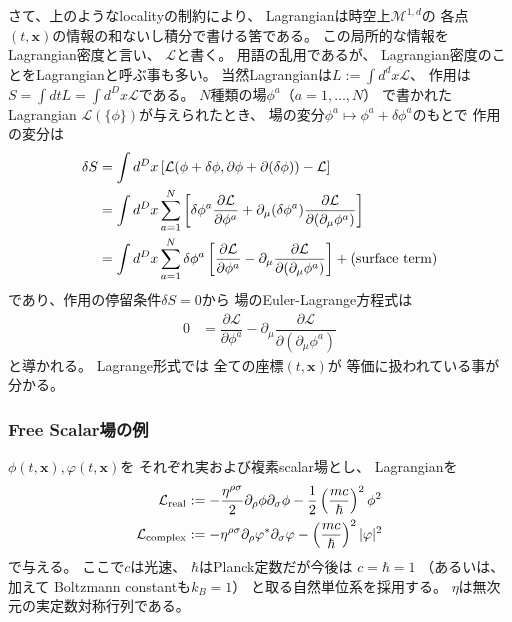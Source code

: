 さて、上のようなlocalityの制約により、
Lagrangianは時空上$\mathcal{M}^{1,d}$の
各点$(t, \bm{x})$の情報の和ないし積分で書ける筈である。
この局所的な情報をLagrangian密度と言い、
$\mathcal{L}$と書く。
用語の乱用であるが、
Lagrangian密度のことをLagrangianと呼ぶ事も多い。
当然Lagrangianは$L := \int d^d x \mathcal{L}$、
作用は$S= \int dt L = \int d^D x \mathcal{L}$である。
$N$種類の場$\phi^a$（$a = 1, \dots, N$）
で書かれたLagrangian
$\mathcal{L}(\{ \phi \})$が与えられたとき、
場の変分$\phi^a \mapsto
\phi^a + \delta \phi^a$のもとで
作用の変分は
\begin{align}
    \delta S
    &=
    \int d^D x
    \left[
        \mathcal{L}(\phi + \delta \phi ,
        \partial \phi + \partial (\delta \phi))
        - \mathcal{L}
    \right]
\notag\\&=
    \int d^D x
        \sum_{a = 1}^N
    \left[
        \delta \phi^a
        \dfrac{\partial \mathcal{L}}
            {\partial \phi^a}
        +
        \partial_\mu (\delta \phi^a)
        \dfrac{\partial \mathcal{L}}
            {\partial (\partial_\mu \phi^a)}
    \right]
\notag\\&=
    \int d^D x
        \sum_{a = 1}^N
    \delta \phi^a
    \left[
        \dfrac{\partial \mathcal{L}}
            {\partial \phi^a}
        -
        \partial_\mu
        \dfrac{\partial \mathcal{L}}
            {\partial (\partial_\mu \phi^a)}
    \right]
    + \text{(surface term)}
\end{align}
であり、作用の停留条件$\delta S = 0$から
場のEuler-Lagrange方程式は
\begin{align}
    0 &=
    \dfrac{\partial \mathcal{L}}
        {\partial \phi^a}
    -
    \partial_\mu
    \dfrac{\partial \mathcal{L}}
        {\partial (\partial_\mu \phi^a)}
\label{field EL eq}
\end{align}
と導かれる。
Lagrange形式では
全ての座標$(t, \bm{x})$が
等価に扱われている事が分かる。

\subsubsection{Free Scalar場の例}

$\phi(t, \bm{x}), \varphi(t, \bm{x})$を
それぞれ実および複素scalar場とし、
Lagrangianを
\begin{align}
    \mathcal{L}_{\rm real}
    &:=
    -
    \dfrac{ \eta^{\rho\sigma} }{2}
        \partial_\rho \phi
        \partial_\sigma \phi
    -
    \dfrac{1}{2}
    \left(
        \dfrac{m c}{\hbar}
    \right)^2
    \phi^2
\label{free real scalar lagrangian}
\\
    \mathcal{L}_{\rm complex}
    &:=
    -
    \eta^{\rho\sigma}
        \partial_\rho \varphi^*
        \partial_\sigma \varphi
    -
    \left(
        \dfrac{m c}{\hbar}
    \right)^2
    |\varphi|^2
\label{free complex scalar lagrangian}
\end{align}
で与える。
ここで$c$は光速、
$\hbar$はPlanck定数だが今後は
$c = \hbar = 1$
（あるいは、加えて
Boltzmann constantも$k_B = 1$）
と取る自然単位系を採用する。
$\eta$は無次元の実定数対称行列である。

